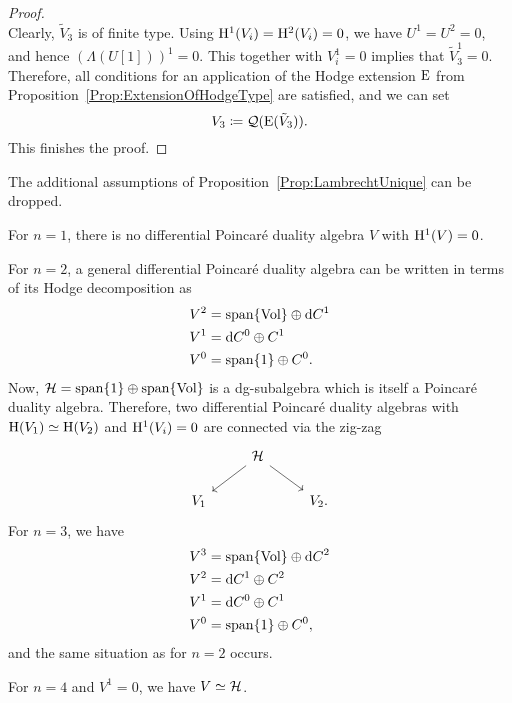 \documentclass[\MainFolder/Text.tex]{subfiles}
\begin{document}
\begin{proof}
\[\]
Clearly, $\tilde{V}_3$ is of finite type.
Using $\mathrm{H}^1(V_i) = \mathrm{H}^2(V_i) = 0$, we have $U^1 = U^2 = 0$, and hence $(\Lambda(U[1]))^1 = 0$.
This together with $V_i^1 = 0$ implies that $\tilde{V}_3^1 = 0$.
Therefore, all conditions for an application of the Hodge extension $\mathrm{E}$ from Proposition~\ref{Prop:ExtensionOfHodgeType} are satisfied, and we can set
$$ V_3\coloneqq \mathcal{Q}(\mathrm{E}(\tilde{V}_3)). $$
This finishes the proof.
%
%
\end{proof}

\begin{Conjecture}\label{Conj:PDGALST}
The additional assumptions of Proposition~\ref{Prop:LambrechtUnique} can be dropped.
\end{Conjecture}

\begin{Remark}[Weak uniqueness in the case of $\H^1(V)=0$ and $n\le 3$]
 For $n=1$, there is no differential Poincar\'e duality algebra $V$ with $\H^1(V) = 0$.
 
 For $n=2$, a general differential Poincar\'e duality algebra can be written in terms of its Hodge decomposition as
 \begin{align*}
 	V^2 & = \mathrm{span}\{\mathrm{Vol}\}\oplus \mathrm{d} C^1\\
	V^1 & = \mathrm{d} C^0 \oplus C^1\\
	V^0 & = \mathrm{span}\{1\} \oplus C^0.
 \end{align*}
 Now, $\mathcal{H} = \mathrm{span}\{1\}\oplus \mathrm{span}\{\mathrm{Vol}\}$ is a dg-subalgebra which is itself a Poincar\'e duality algebra. Therefore, two differential Poincar\'e duality algebras with $\mathrm{H}(V_1)\simeq \mathrm{H}(V_2)$ and $\mathrm{H}^1(V_i) = 0$ are connected via the zig-zag
\[
\begin{tikzcd}
& \Harm \arrow{dr}{} \arrow[swap]{dl}{} & \\
V_1 & & V_2.
\end{tikzcd}
\]
For $n=3$, we have 
\begin{align*}
	V^3 & = \mathrm{span}\{\mathrm{Vol}\} \oplus \mathrm{d} C^2\\
 	V^2 & =\mathrm{d} C^1 \oplus C^2 \\
	V^1 & = \mathrm{d} C^0 \oplus C^1\\
	V^0 & = \mathrm{span}\{1\} \oplus C^0,
\end{align*}
and the same situation as for $n=2$ occurs.

For $n=4$ and $V^1 = 0$, we have $V \simeq \mathcal{H}$.
\end{Remark}
\end{document}
